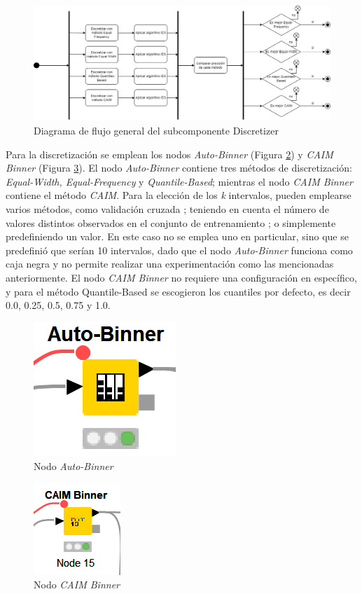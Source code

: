 \begin{figure}[H]
	\centering
	\includegraphics[width=0.7\linewidth]{"figuras/capi 2/diagrama-flujo-discretizer"}
	\caption[Diagrama de flujo general del subcomponente Discretizer]{Diagrama de flujo general del subcomponente Discretizer}
	\label{fig:diagrama-flujo-discretizer}
\end{figure}

Para la discretización se emplean los nodos \textit{Auto-Binner} (Figura \ref{fig:auto-binner-nodo}) y \textit{CAIM Binner} (Figura \ref{fig:caim-binner-nodo}). El nodo \textit{Auto-Binner} contiene tres métodos de discretización: \textit{Equal-Width, Equal-Frequency} y \textit{Quantile-Based}; mientras el nodo \textit{CAIM Binner} contiene el método \textit{CAIM}. Para la elección de los \textit{k} intervalos, pueden emplearse varios métodos, como validación cruzada \cite{torgo1997search}; teniendo en cuenta el número de valores distintos observados en el conjunto de entrenamiento \citep{dougherty1995supervised}; o simplemente predefiniendo un valor. En este caso no se emplea uno en particular, sino que se predefinió que serían 10 intervalos, dado que el nodo \textit{Auto-Binner} funciona como caja negra y no permite realizar una experimentación como las mencionadas anteriormente. El nodo \textit{CAIM Binner} no requiere una configuración en específico, y para el método Quantile-Based se escogieron los cuantiles por defecto, es decir 0.0, 0.25, 0.5, 0.75 y 1.0.\\

\begin{figure}[H]
	\centering
	\includegraphics[width=0.15\linewidth]{"figuras/capi 2/auto-binner-nodo"}
	\caption[Nodo Auto-Binner]{Nodo \textit{Auto-Binner}}
	\label{fig:auto-binner-nodo}
\end{figure}

\begin{figure}[H]
	\centering
	\includegraphics[width=0.15\linewidth]{"figuras/capi 2/caim-binner-nodo"}
	\caption[Nodo CAIM Binner]{Nodo \textit{CAIM Binner}}
	\label{fig:caim-binner-nodo}
\end{figure}

